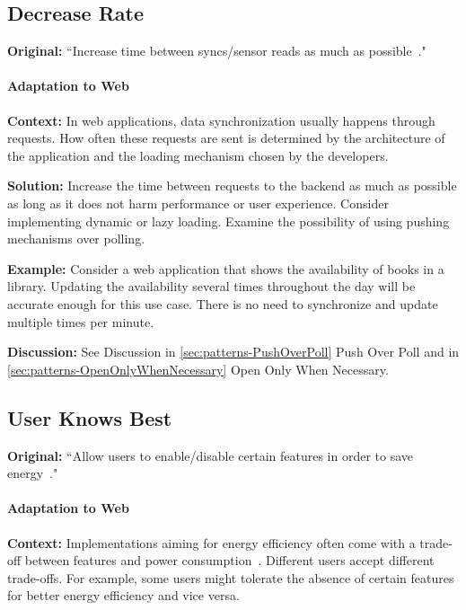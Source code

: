 \subsection{Decrease Rate} \label{sec:patterns-DecreaseRate}
\textbf{Original:} ``Increase time between syncs/sensor reads as much as possible~\cite{cruz2019catalog}."

\paragraph{Adaptation to Web}\mbox{}

\textbf{Context:} In web applications, data synchronization usually happens through requests. How often these requests are sent is determined by the architecture of the application and the loading mechanism chosen by the developers.

\textbf{Solution:} Increase the time between requests to the backend as much as possible as long as it does not harm performance or user experience. Consider implementing dynamic or lazy loading. Examine the possibility of using pushing mechanisms over polling.

\textbf{Example:} Consider a web application that shows the availability of books in a library. Updating the availability several times throughout the day will be accurate enough for this use case. There is no need to synchronize and update multiple times per minute.

\textbf{Discussion:} See Discussion in \ref{sec:patterns-PushOverPoll} Push Over Poll and in \ref{sec:patterns-OpenOnlyWhenNecessary} Open Only When Necessary.


\subsection{User Knows Best} \label{sec:patterns-UserKnowsBest}
\textbf{Original:} ``Allow users to enable/disable certain features in order to save energy~\cite{cruz2019catalog}."

\paragraph{Adaptation to Web}\mbox{}

\textbf{Context:} Implementations aiming for energy efficiency often come with a trade-off between features and power consumption~\cite{cruz2019catalog}. Different users accept different trade-offs. For example, some users might tolerate the absence of certain features for better energy efficiency and vice versa.

